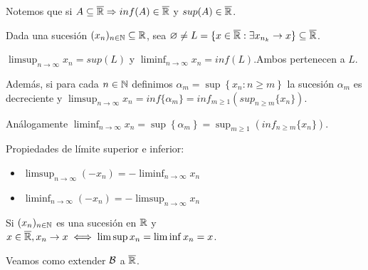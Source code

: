 Notemos que si $A \subseteq \overline{\mathbb{R}} \Rightarrow inf(A) \in \overline{\mathbb{R}}$ y $sup(A) \in \overline{\mathbb{R}}$.

Dada una sucesión $(x_n)_{n \in \mathbb{N}} \subseteq \mathbb{R}$, sea $\varnothing \neq L = \{ x \in \overline{\mathbb{R}} : \exists x_{n_k} \to x \} \subseteq \overline{\mathbb{R}}$.

\begin{definition}
    $\limsup_{n \to \infty} x_n = sup(L)$ y $\liminf_{n \to \infty} x_n = inf(L)$.Ambos pertenecen a $L$.

    Además, si para cada $n \in \mathbb{N}$ definimos $\alpha_m = \sup \left\{ x_n : n \geq m \right\}$ la sucesión $\alpha_m$ es decreciente y
    $\limsup_{n \to \infty} x_n = inf\{\alpha_m\} = inf_{m \geq 1} ( sup_{n \geq m}\{x_n\} )$.

    Análogamente $\liminf_{n \to \infty} x_n = \sup\left\{\alpha_m\right\} = \sup_{m \geq 1} ( inf_{n \geq m}\{x_n\} )$.
\end{definition}

\begin{prop}
    Propiedades de límite superior e inferior:
    \begin{itemize}
        \item $\limsup_{n \to \infty} (- x_n) = - \liminf_{n \to \infty} x_n$
        \item $\liminf_{n \to \infty} (- x_n) = - \limsup_{n \to \infty} x_n$
    \end{itemize}
\end{prop}

\begin{note}
    Si $(x_n)_{n \in \mathbb{N}}$ es una sucesión en $\mathbb{R}$ y $x \in \overline{\mathbb{R}}, x_n \to x \iff \limsup x_n = \liminf x_n = x$.
\end{note}

Veamos como extender $\mathcal{B}$ a $\overline{\mathbb{R}}$.


